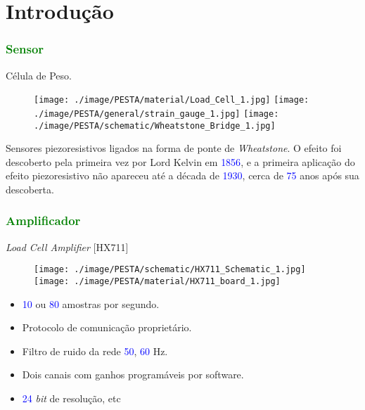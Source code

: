 \section{Introdução}
\begin{frame}
\frametitle{\textcolor{green}{Sensor}}
Célula de Peso.
\begin{figure}[!b]
	\texttt{[image: ./image/PESTA/material/Load\_Cell\_1.jpg]}
	\hspace{.1cm}
	\texttt{[image: ./image/PESTA/general/strain\_gauge\_1.jpg]}
	\hspace{.1cm}
	\texttt{[image: ./image/PESTA/schematic/Wheatstone\_Bridge\_1.jpg]}
\end{figure}
Sensores piezoresistivos ligados na forma de ponte de \textit{Wheatstone}.
\newline
\newline
O efeito foi descoberto pela primeira vez por Lord Kelvin em \textcolor{blue}{1856}, e a primeira aplicação do efeito piezoresistivo não apareceu até a década de \textcolor{blue}{1930}, cerca de \textcolor{blue}{75} anos após sua descoberta.
\end{frame}
\begin{frame}
\frametitle{\textcolor{green}{Amplificador}}
\textit{Load Cell Amplifier} [HX711]
\begin{figure}[H]
	\texttt{[image: ./image/PESTA/schematic/HX711\_Schematic\_1.jpg]}
	\hspace{2cm}
	\texttt{[image: ./image/PESTA/material/HX711\_board\_1.jpg]}
\end{figure}
\begin{itemize}
	\item \textcolor{blue}{10} ou \textcolor{blue}{80} amostras por segundo.
	\item Protocolo de comunicação proprietário.
	\item Filtro de ruido da rede \textcolor{blue}{50}, \textcolor{blue}{60} Hz.
	\item Dois canais com ganhos programáveis por software.
	\item \textcolor{blue}{24} \textit{bit} de resolução, etc
\end{itemize}
\end{frame}


